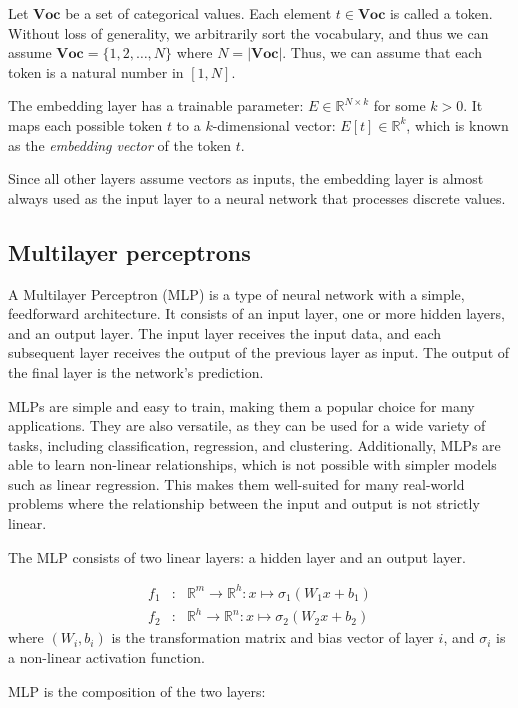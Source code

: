 Let $\mathbf{Voc}$ be a set of categorical values.  Each element $t\in\mathbf{Voc}$ is called a token.  Without loss of generality, we
arbitrarily sort the vocabulary, and thus we can assume $\mathbf{Voc} = \{1, 2, \dots, N\}$ where $N = |\mathbf{Voc}|$.  Thus,
we can assume that each token is a natural number in $[1, N]$.

The embedding layer has a trainable parameter: $E\in\mathbb{R}^{N\times k}$ for some $k>0$.  It maps each possible token $t$
to a $k$-dimensional vector: $E[t]\in\mathbb{R}^k$, which is known as the {\em embedding vector} of the token $t$.

Since all other layers assume vectors as inputs, the embedding layer is almost always used as the input layer to a neural network
that processes discrete values.

\subsection{Multilayer perceptrons}
\label{sec:mlp}
A Multilayer Perceptron (MLP) is a type of neural network with a simple, feedforward architecture. It consists of an input layer, one or more hidden layers, and an output layer. The input layer receives the input data, and each subsequent layer receives the output of the previous layer as input. The output of the final layer is the network's prediction.

MLPs are simple and easy to train, making them a popular choice for many applications. They are also versatile, as they can be used for a wide variety of tasks, including classification, regression, and clustering. Additionally, MLPs are able to learn non-linear relationships, which is not possible with simpler models such as linear regression. This makes them well-suited for many real-world problems where the relationship between the input and output is not strictly linear.

The MLP consists of two linear layers: a hidden layer and an output layer.

\begin{eqnarray*}
f_1 &:& \mathbb{R}^m \to \mathbb{R}^h : x \mapsto \sigma_1(W_1 x+b_1)\\
f_2 &:& \mathbb{R}^h \to \mathbb{R}^n : x \mapsto \sigma_2(W_2x+b_2)
\end{eqnarray*}
where $(W_i, b_i)$ is the transformation matrix and bias vector of layer $i$, and $\sigma_i$ is a non-linear activation function.

MLP is the composition of the two layers:

